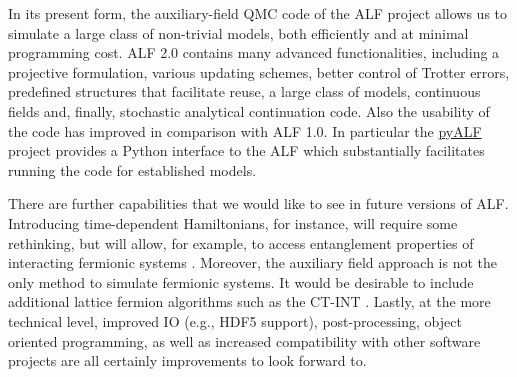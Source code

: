 
In its present form, the  auxiliary-field QMC code of the ALF project allows us to simulate a large class of non-trivial models, both efficiently and at minimal  programming cost.  ALF 2.0 contains many advanced functionalities, including a projective formulation, various updating schemes, better control of Trotter errors, predefined structures that facilitate reuse, a large class of models, continuous fields and, finally, stochastic analytical continuation code. Also the usability of the code has improved in comparison with ALF 1.0. In particular the \href{https://git.physik.uni-wuerzburg.de/ALF/pyALF}{pyALF} project provides a Python interface to the ALF which substantially facilitates running the code for established models.

There are further capabilities that we would like to see in future versions of ALF. Introducing time-dependent Hamiltonians, for instance, will require some rethinking, but will allow, for example, to access entanglement properties of interacting fermionic systems \cite{Broecker14,Assaad14,Assaad13a,Assaad15}. Moreover, the auxiliary field approach is not the only method to simulate fermionic systems.
It would be desirable to include additional lattice fermion algorithms such as the CT-INT \cite{Rubtsov05,Assaad07}.
Lastly, at the more technical level, improved IO (e.g., HDF5 support), post-processing, object oriented programming, as well as increased compatibility with other software projects are all certainly improvements to look forward to. 

